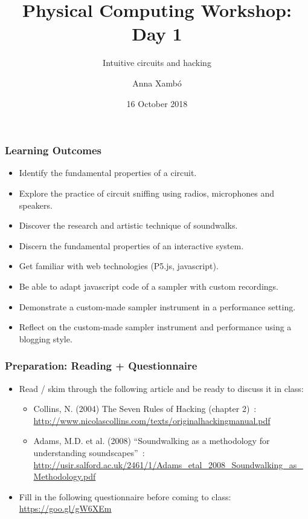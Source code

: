 \documentclass[screen, aspectratio=43]{beamer}
\title[PCW-d1]{Physical Computing Workshop: Day 1}
\subtitle{Intuitive circuits and hacking}
\author[A. Xamb{\'o}]{Anna Xamb{\'o}}
\institute[NTNU]{Department of Music, NTNU}
\date{16 October 2018}
\begin{document}
\begin{frame}
  \titlepage
\end{frame}
%
\begin{frame}
  \frametitle{Learning Outcomes}
  \begin{itemize}
    \item Identify the fundamental properties of a circuit.
    \item Explore the practice of circuit sniffing using radios, microphones and speakers.
    \item Discover the research and artistic technique of soundwalks.
    \item Discern the fundamental properties of an interactive system.
    \item Get familiar with web technologies (P5.js, javascript).
    \item Be able to adapt javascript code of a sampler with custom recordings. 
    \item Demonstrate a custom-made sampler instrument in a performance setting.
    \item Reflect on the custom-made sampler instrument and performance using a blogging style.
    \end{itemize}
\end{frame}
%
\begin{frame}
  \frametitle{Preparation: Reading + Questionnaire}
        \begin{itemize}
        \item Read / skim through the following article and be ready to discuss it in class:
         \begin{itemize}
         \item Collins, N. (2004) The Seven Rules of Hacking (chapter 2)~\cite{Collins.2006.handmadebook}:\\
         \url{http://www.nicolascollins.com/texts/originalhackingmanual.pdf}
         \item  Adams, M.D. et al. (2008) ``Soundwalking as a methodology for understanding soundscapes''~\cite{Adams.2008.soundwalking}:\\
         \url{http://usir.salford.ac.uk/2461/1/Adams_etal_2008_Soundwalking_as_Methodology.pdf}
         \end{itemize}
        \item Fill in the following questionnaire before coming to class: \\
 	\url{https://goo.gl/gW6XEm}       
         \end{itemize}
\end{frame}
\end{document}
